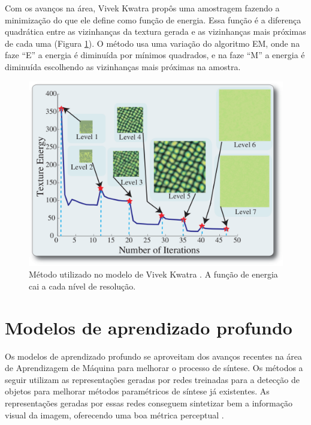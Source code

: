 Com os avanços na área,
Vivek Kwatra \cite{Kwatra2005} propôs
uma amostragem fazendo a minimização
do que ele define como função de energia. 
Essa função é a diferença quadrática
entre as vizinhanças da textura gerada
e as vizinhanças mais próximas de cada uma (Figura \ref{kwatra}).
O método usa uma variação do algoritmo EM, 
onde na faze ``E'' a energia é diminuída
por mínimos quadrados, e na faze ``M'' a
energia é diminuída escolhendo as
vizinhanças mais próximas na amostra.

\begin{figure}[!ht]
	\centering
	\includegraphics[width=\linewidth*2/3]{files/assets/articles/kwatra.png}
	\caption{Método utilizado no modelo de Vivek Kwatra \cite{Kwatra2005}.
	A função de energia cai a cada nível de resolução.}
	\label{kwatra}
\end{figure}


\newpage
\section{Modelos de aprendizado profundo}

Os modelos de aprendizado profundo se aproveitam
dos avanços recentes na área de Aprendizagem
de Máquina para melhorar o processo de síntese.
Os métodos a seguir utilizam as representações
geradas por redes treinadas para a detecção
de objetos para melhorar métodos paramétricos
de síntese já existentes.
As representações geradas por essas
redes conseguem sintetizar bem a informação
visual da imagem, oferecendo uma boa
métrica perceptual \cite{Zhang2018}.


